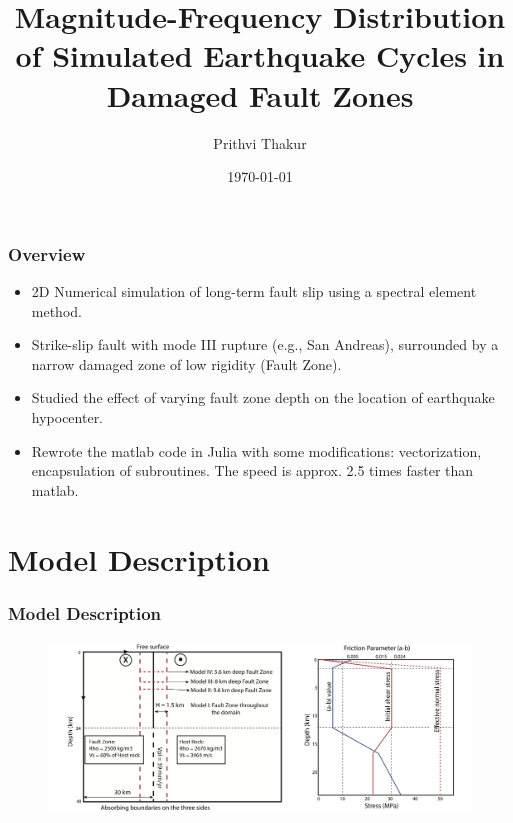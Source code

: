 \documentclass{beamer}
\title[MFD in EQ Cycles]{Magnitude-Frequency Distribution of Simulated Earthquake Cycles in Damaged Fault Zones}
\author{Prithvi Thakur}
\institute[UofM]
{
University of Michigan \\ %
\medskip
\textit{prith@umich.edu} %
}
\date{\today} %
\begin{document}
\begin{frame}
    \titlepage 
\end{frame}

\begin{frame}
    \frametitle{Overview}
    \begin{itemize}
        \item 2D Numerical simulation of long-term fault slip using a spectral element method. 
        \item Strike-slip fault with mode III rupture (e.g., San Andreas), surrounded by a narrow damaged zone
            of low rigidity (Fault Zone).
        \item Studied the effect of varying fault zone depth on the location of earthquake hypocenter.
        \item Rewrote the matlab code in Julia with some modifications: vectorization, encapsulation of subroutines. The speed is approx. 2.5 times faster than matlab.
    \end{itemize}
\end{frame}

\section{Model Description}
\begin{frame}
    \frametitle{Model Description}
    \begin{figure}
        \includegraphics[width=0.9\linewidth]{images/model_setup}
    \end{figure}
\end{frame}

\end{document}
